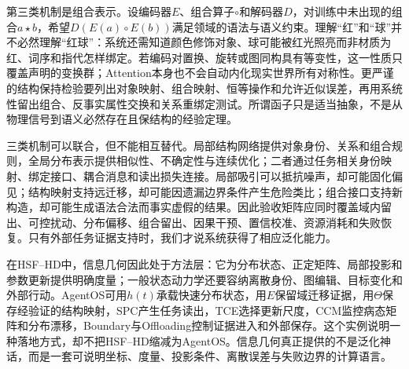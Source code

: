 第三类机制是组合表示。设编码器$E$、组合算子$\circ$和解码器$D$，对训练中未出现的组合$a\star b$，希望$D(E(a)\circ E(b))$满足领域的语法与语义约束。理解“红”和“球”并不必然理解“红球”：系统还需知道颜色修饰对象、球可能被红光照亮而非材质为红、词序和指代怎样绑定。若编码对置换、旋转或图同构具有等变性，这一性质只覆盖声明的变换群；Attention本身也不会自动内化现实世界所有对称性。更严谨的结构保持检验要列出对象映射、组合映射、恒等操作和允许近似误差，再用系统性留出组合、反事实属性交换和关系重绑定测试。所谓函子只是适当抽象，不是从物理信号到语义必然存在且保结构的经验定理。

三类机制可以联合，但不能相互替代。局部结构网络提供对象身份、关系和组合规则，全局分布表示提供相似性、不确定性与连续优化；二者通过任务相关身份映射、绑定接口、耦合消息和读出损失连接。局部吸引可以抵抗噪声，却可能固化偏见；结构映射支持远迁移，却可能因遗漏边界条件产生危险类比；组合接口支持新构造，却可能生成语法合法而事实虚假的结果。因此验收矩阵应同时覆盖域内留出、可控扰动、分布偏移、组合留出、因果干预、置信校准、资源消耗和失败恢复。只有外部任务证据支持时，我们才说系统获得了相应泛化能力。

在HSF--HD中，信息几何因此处于方法层：它为分布状态、正定矩阵、局部投影和参数更新提供明确度量；一般状态动力学还要容纳离散身份、图编辑、目标变化和外部行动。AgentOS可用$h(t)$承载快速分布状态，用$E$保留域迁移证据，用$\Theta$保存经验证的结构映射，SPC产生任务读出，TCE选择更新尺度，CCM监控病态矩阵和分布漂移，Boundary与Offloading控制证据进入和外部保存。这个实例说明一种落地方式，却不把HSF--HD缩减为AgentOS。信息几何真正提供的不是泛化神话，而是一套可说明坐标、度量、投影条件、离散误差与失败边界的计算语言。

